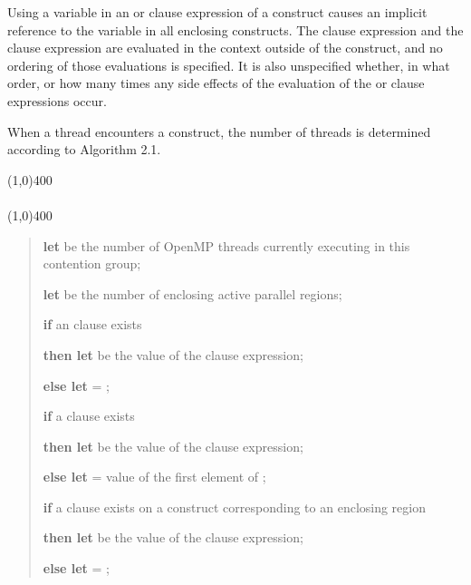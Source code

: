 Using a variable in an  or  clause expression of a
 construct causes an implicit reference to the variable in all enclosing
constructs. The  clause expression and the  clause expression are
evaluated in the context outside of the  construct, and no ordering of those
evaluations is specified. It is also unspecified whether, in what order, or how many times
any side effects of the evaluation of the  or  clause expressions occur.

When a thread encounters a  construct, the number of threads is determined
according to Algorithm 2.1.


\begin{samepage}
\nolinenumbers\line(1,0){400}\\[.4\baselineskip]
\\[-0.5\baselineskip]
\line(1,0){400}\linenumbers

\begin{quote}
\textbf{let}  be the number of OpenMP threads currently executing in
this contention group;

\textbf{let}  be the number of enclosing active parallel regions;

\textbf{if} an  clause exists

\textbf{then let}  be the value of the  clause expression;

\textbf{else let}  = ;

\textbf{if} a  clause exists

\textbf{then let}  be the value of the  clause
expression;

\textbf{else let}  = value of the first element of ;

\textbf{if} a  clause exists on a  construct corresponding to an enclosing  region

\textbf{then let}  be the value of the  clause expression;

\textbf{else let}  = ;


\end{quote}
\end{samepage}
